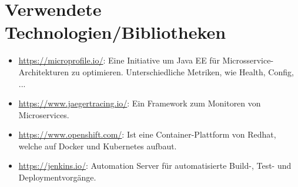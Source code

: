 \documentclass[11pt, a4paper]{article}   	%
\begin{document}
\section{Verwendete Technologien/Bibliotheken}
\begin{itemize}
	\item \href{https://microprofile.io/}{https://microprofile.io/}: Eine Initiative um Java EE für Microsservice-Architekturen zu optimieren. Unterschiedliche Metriken, wie Health, Config, ...
	\item \href{https://www.jaegertracing.io/}{https://www.jaegertracing.io/}: Ein Framework zum Monitoren von Microservices.
	\item \href{https://www.openshift.com/}{https://www.openshift.com/}: Ist eine Container-Plattform von Redhat, welche auf Docker und Kubernetes aufbaut.
	\item \href{https://jenkins.io/}{https://jenkins.io/}: Automation Server für automatisierte Build-, Test- und Deploymentvorgänge.
\end{itemize}
\end{document}
